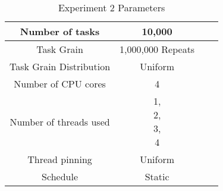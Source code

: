 \begin{table}
\centering
 \begin{tabular}{|c|c|c|c|}
  \hline
  Number of tasks & 10,000 \\
  \hline
  Task Grain & 1,000,000 Repeats \\
  \hline
  Task Grain Distribution & Uniform \\
  \hline
  Number of CPU cores & 4 \\
  \hline
  Number of threads used & \specialcell{1, \\ 2, \\ 3, \\ 4} \\
  \hline
  Thread pinning & Uniform \\
  \hline
  Schedule & Static \\
  \hline
 \end{tabular}
\caption{Experiment 2 Parameters}
\iflabelb
\label{table:evaluation_ex2_parameters}
\fi
{}
\end{table}
